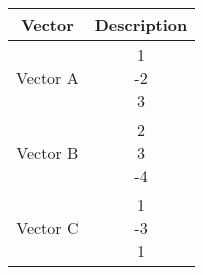 \begin{tabular}{|c|c|}
	\hline
	Vector&Description\\
	\hline
	Vector A&  \myvec{1\\-2\\3}\\
	\hline
	Vector B& \myvec{2\\3\\-4}\\
	\hline
	Vector C& \myvec{1\\-3\\1}\\
	\hline
\end{tabular}
